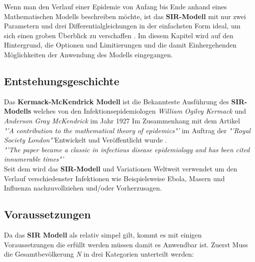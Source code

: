 \documentclass[12pt]{scrartcl} %
\begin{document}
Wenn man den Verlauf einer Epidemie von Anfang bis Ende anhand eines Mathematischen Modells beschreiben möchte, ist das \textbf{SIR-Modell} mit nur zwei Parametern und drei Differentialgleichungen in der einfachsten Form ideal, um sich einen groben Überblick zu verschaffen \cite{4}.
Im diesem Kapitel wird auf den Hintergrund, die Optionen und Limitierungen und die damit Einhergehenden Möglichkeiten der Anwendung des Modells eingegangen.


\subsection{Entstehungsgeschichte}

Das \textbf{Kermack-McKendrick Modell} ist die Bekannteste Ausführung des \textbf{SIR-Modells} welches von den Infektionsepidemiologen \textsl{William Ogilvy Kermack} und \textsl{Anderson Gray McKendrick} im Jahr 1927 Im Zusammenhang mit dem Artikel 
\textsl{"'A contribution to the mathematical theory of epidemics"'} \cite{7} im Auftrag der \textsl{"'Royal Society London"'}Entwickelt und Veröffentlicht wurde \cite{6}.\\

\textsl{"'The paper became a classic in infectious disease epidemiology and has been cited innumerable times"'} \cite{6} \\

Seit dem wird das \textbf{SIR-Modell} und Variationen Weltweit verwendet um den Verlauf verschiedenster Infektionen
wie Beispielsweise Ebola, Masern und Influenza nachzuvollziehen und/oder Vorherzusagen. \cite{3}



\subsection{Voraussetzungen}

Da das \textbf{SIR Modell} als relativ simpel gilt, kommt es mit einigen Voraussetzungen die erfüllt werden müssen damit es Anwendbar ist.
Zuerst Muss die Gesamtbevölkerung \textit{N} in drei Kategorien unterteilt werden:
\end{document}
